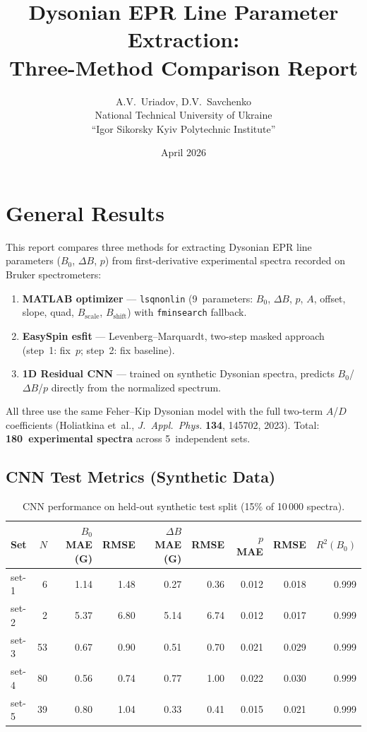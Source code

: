 \documentclass[a4paper,11pt]{article}
\title{Dysonian EPR Line Parameter Extraction:\\Three-Method Comparison Report}
\author{A.V.~Uriadov, D.V.~Savchenko\\
National Technical University of Ukraine\\``Igor Sikorsky Kyiv Polytechnic Institute''}
\date{April 2026}
\begin{document}
\maketitle
\tableofcontents
\newpage

\section{General Results}

This report compares three methods for extracting Dysonian EPR line
parameters ($B_0$, $\Delta B$, $p$) from first-derivative experimental
spectra recorded on Bruker spectrometers:

\begin{enumerate}
    \item \textbf{MATLAB optimizer} --- \texttt{lsqnonlin} (9~parameters:
          $B_0$, $\Delta B$, $p$, $A$, offset, slope, quad, $B_\mathrm{scale}$,
          $B_\mathrm{shift}$) with \texttt{fminsearch} fallback.
    \item \textbf{EasySpin esfit} --- Levenberg--Marquardt, two-step masked
          approach (step~1: fix~$p$; step~2: fix baseline).
    \item \textbf{1D Residual CNN} --- trained on synthetic Dysonian spectra,
          predicts $B_0$/$\Delta B$/$p$ directly from the normalized spectrum.
\end{enumerate}

All three use the same Feher--Kip Dysonian model with the full two-term
$A$/$D$ coefficients (Holiatkina et~al., \textit{J.~Appl.~Phys.}
\textbf{134}, 145702, 2023). Total: \textbf{180~experimental spectra}
across 5~independent sets.

\subsection{CNN Test Metrics (Synthetic Data)}

\begin{table}[H]
\centering
\caption{CNN performance on held-out synthetic test split (15\% of 10\,000 spectra).}
\label{tab:cnn-metrics}
\begin{tabular}{lrrrrrrrr}
\toprule
Set & $N$ & $B_0$ MAE (G) & RMSE & $\Delta B$ MAE (G) & RMSE & $p$ MAE & RMSE & $R^2(B_0)$ \\
\midrule
set-1 & 6 & 1.14 & 1.48 & 0.27 & 0.36 & 0.012 & 0.018 & 0.999 \\
set-2 & 2 & 5.37 & 6.80 & 5.14 & 6.74 & 0.012 & 0.017 & 0.999 \\
set-3 & 53 & 0.67 & 0.90 & 0.51 & 0.70 & 0.021 & 0.029 & 0.999 \\
set-4 & 80 & 0.56 & 0.74 & 0.77 & 1.00 & 0.022 & 0.030 & 0.999 \\
set-5 & 39 & 0.80 & 1.04 & 0.33 & 0.41 & 0.015 & 0.021 & 0.999 \\
\bottomrule
\end{tabular}
\end{table}
\end{document}
